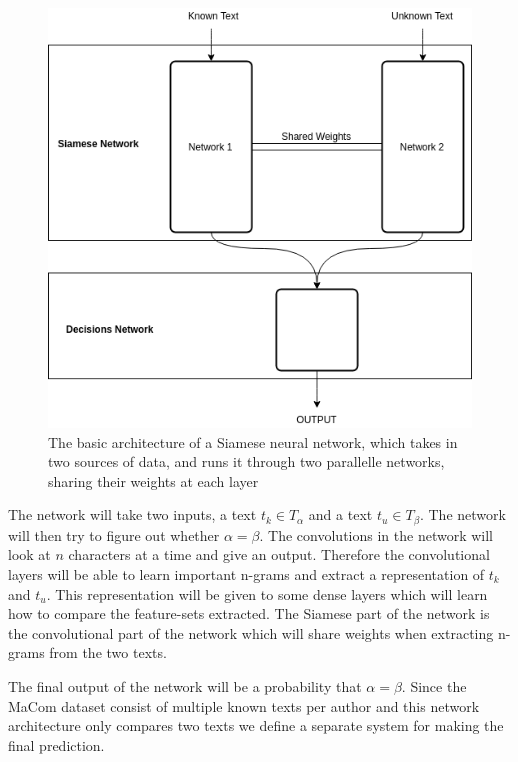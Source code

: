 \begin{figure}
    \centering
    \includegraphics[scale=0.5]{./pictures/method/Siamese.png}
    \caption{The basic architecture of a Siamese neural network, which takes in
        two sources of data, and runs it through two parallelle networks,
        sharing their weights at each layer}
    \label{fig:siamese_example}
\end{figure}

The network will take two inputs, a text $t_k \in T_\alpha$ and a text $t_u
\in T_\beta$. The network will then try to figure out whether $\alpha =
\beta$. The convolutions in the network will look at $n$ characters at a
time and give an output. Therefore the convolutional layers will be able to
learn important n-grams and extract a representation of $t_k$ and $t_u$. This
representation will be given to some dense layers which will learn how to
compare the feature-sets extracted. The Siamese part of the network is the
convolutional part of the network which will share weights when extracting
n-grams from the two texts.

The final output of the network will be a probability that $\alpha = \beta$.
Since the MaCom dataset consist of multiple known texts per author and this
network architecture only compares two texts we define a separate system for
making the final prediction.

